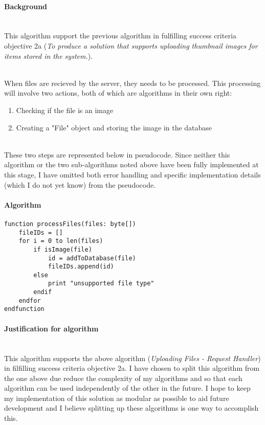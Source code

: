 \documentclass[../../main.tex]{subfiles}
\begin{document}
\paragraph{Background}

\noindent \\ This algorithm support the previous algorithm in fulfilling success criteria objective 2a
(\textit{To produce a solution that supports uploading thumbnail images for items stored in the system.}).

\noindent \\ When files are recieved by the server, they needs to be processed. This processing will involve
two actions, both of which are algorithms in their own right:

\begin{enumerate}
    \item Checking if the file is an image
    \item Creating a "File" object and storing the image in the database
\end{enumerate}

\noindent \\ These two steps are represented below in pseudocode.
Since neither this algorithm or the two sub-algorithms noted above have been fully implemented at this stage,
I have omitted both error handling and specific implementation details (which I do not yet know) from the
pseudocode.

\paragraph{Algorithm}

\paragraph{} %

\begin{lstlisting}
function processFiles(files: byte[])
    fileIDs = []
    for i = 0 to len(files)
        if isImage(file)
            id = addToDatabase(file)
            fileIDs.append(id)
        else
            print "unsupported file type"
        endif
    endfor
endfunction
\end{lstlisting}

\paragraph{Justification for algorithm}

\noindent \\ This algorithm supports the above algorithm (\textit{Uploading Files - Request Handler}) in
filfilling success criteria objective 2a. I have chosen to split this algorithm from the one above due reduce
the complexity of my algorithms and so that each algorithm can be used independently of the other in the future.
I hope to keep my implementation of this solution as modular as possible to aid future development and I believe
splitting up these algorithms is one way to accomplish this.
\end{document}
